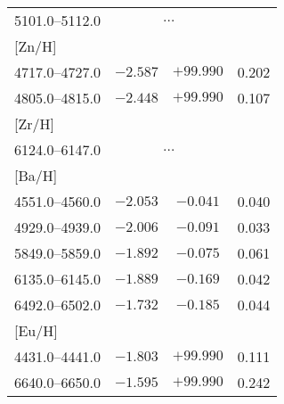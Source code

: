 \documentclass{aa}
\begin{document}
\begin{appendix}
\begin{table}
{\begin{tabular}{lccc}
5101.0--5112.0 & \multicolumn{2}{c}{$\ldots$} \\
\mbox{[Zn/H]} \\
4717.0--4727.0 & $-2.587$ & $+99.990$ & 0.202\\
4805.0--4815.0 & $-2.448$ & $+99.990$ & 0.107\\
\mbox{[Zr/H]} \\
6124.0--6147.0 & \multicolumn{2}{c}{$\ldots$} \\
\mbox{[Ba/H]} \\
4551.0--4560.0 & $-2.053$ & $-0.041$ & 0.040\\
4929.0--4939.0 & $-2.006$ & $-0.091$ & 0.033\\
5849.0--5859.0 & $-1.892$ & $-0.075$ & 0.061\\
6135.0--6145.0 & $-1.889$ & $-0.169$ & 0.042\\
6492.0--6502.0 & $-1.732$ & $-0.185$ & 0.044\\
\mbox{[Eu/H]} \\
4431.0--4441.0 & $-1.803$ & $+99.990$ & 0.111\\
6640.0--6650.0 & $-1.595$ & $+99.990$ & 0.242\\
\hline
\end{tabular}
}
\end{table}

\end{appendix}
\end{document}
